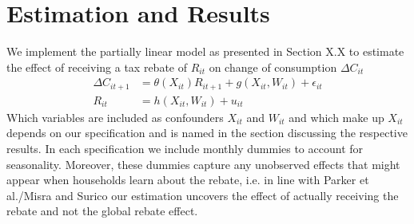 \section{Estimation and Results} \label{sec:estim_res}
We implement the partially linear model as presented in Section X.X to estimate the effect of receiving a tax rebate of $R_{it}$ on change of consumption $\Delta C_{it}$
\begin{align}
    \Delta C_{it+1}&=\theta(X_{it})R_{it+1}+g(X_{it}, W_{it})+\epsilon_{it} \label{eq:plm_C1}\\
    R_{it}&=h(X_{it}, W_{it})+u_{it} \label{eq:plm_C2}
\end{align}
Which variables are included as confounders $X_{it}$ and $W_{it}$ and which make up $X_{it}$ depends on our specification and is named in the section discussing the respective results. In each specification we include monthly dummies to account for seasonality. Moreover, these dummies capture any unobserved effects that might appear when households learn about the rebate, i.e. in line with Parker et al./Misra and Surico our estimation uncovers the effect of actually receiving the rebate and not the global rebate effect.

